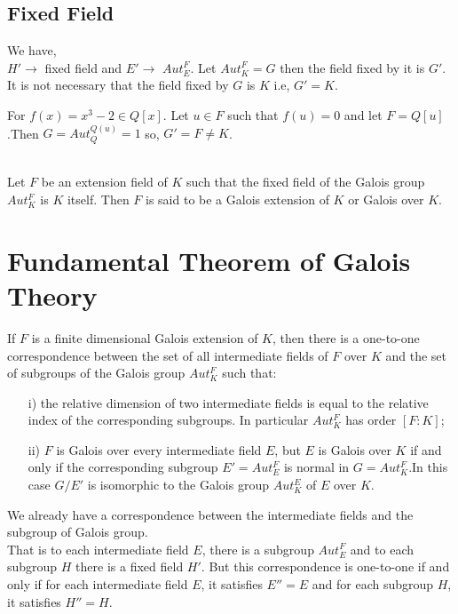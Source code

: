 \subsection{Fixed Field}
We have,\\
\(H' \rightarrow\) fixed field and \(E' \rightarrow\) \(Aut_E^F\).\hspace{5mm} Let \(Aut_K^F = G\) then the field fixed by it is \(G'\). It is not necessary that the field fixed by \(G\) is \(K\) i.e, \(G'=K\).\\
\begin{example}
For \(f(x)=x^3-2 \in Q[x]\). Let \(u \in F\) such that \(f(u)=0\) and let \(F=Q[u]\).Then
\(G=Aut_Q^{Q(u)}={1}\) so, \hspace{5mm}\(G'=F \neq K\).\\ \\
\end{example}

\begin{definition}
  Let \(F\) be an extension field of \(K\) such that the fixed field of the Galois group \(Aut_K^F\) is \(K\) itself. Then \(F\) is said to be a Galois extension of \(K\) or Galois over \( K\).
\end{definition}

\section{Fundamental Theorem of Galois Theory}
\begin{theorem}
If \(F\) is a finite dimensional Galois extension of \(K\), then there is a one-to-one correspondence between the set of all intermediate fields of \(F\) over \(K\) and the set of subgroups of the Galois group \(Aut_K^F\) such that:
\begin{enumerate}
\item[i)] the relative dimension of two intermediate fields is equal to the relative index of the corresponding subgroups. In particular \(Aut_K^F\) has order \([F:K]\);
  \item[ii)] \(F\) is Galois over every intermediate field \(E\), but \(E\) is Galois over \(K\) if and only if the corresponding subgroup \(E'= Aut_E^F\) is normal in \(G=Aut_K^F\).In this case \(G/E'\) is isomorphic to the Galois group \(Aut_K^E\) of \(E\) over \(K\).
  \end{enumerate}
\end{theorem}

  We already have a correspondence between the intermediate fields and the subgroup of Galois group.\\
 That is to each intermediate field \(E\), there is a subgroup \(Aut_E^F\) and to each subgroup \(H\) there is a fixed field \(H'\). But this correspondence is one-to-one if and only if for each intermediate field \(E\), it satisfies \(E''=E\) and for each subgroup \(H\), it satisfies \(H''=H\).

